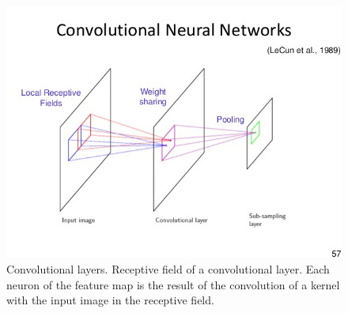 \documentclass[final, paper=letter,5p,times,twocolumn]{elsarticle}
\begin{document}
\begin{figure}[htbp]
   \begin{center}
      \includegraphics[scale=0.3, angle=0]{images/Bishop_cnn_layer.jpg}
   \end{center}
   \caption{Convolutional layers. Receptive field of a convolutional layer. Each neuron of the feature map is the result of the convolution of a kernel with the input image in the receptive field.}
  \label{fig:Convolutional_layers} 
\end{figure}
\end{document}
